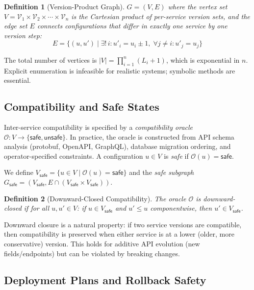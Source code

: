 \documentclass[10pt,twocolumn]{article}
\newtheorem{definition}{Definition}
\begin{document}
\begin{definition}[Version-Product Graph]
$G = (V, E)$ where the vertex set $V = \mathcal{V}_1 \times
\mathcal{V}_2 \times \cdots \times \mathcal{V}_n$ is the
Cartesian product of per-service version sets, and the edge
set $E$ connects configurations that differ in exactly one
service by one version step:
\[
  E = \{(u, u') \mid \exists!\, i : u'_i = u_i \pm 1,\;
        \forall j \neq i : u'_j = u_j\}
\]
\end{definition}

The total number of vertices is $|V| = \prod_{i=1}^{n} (L_i + 1)$,
which is exponential in $n$. Explicit enumeration is infeasible
for realistic systems; symbolic methods are essential.

\subsection{Compatibility and Safe States}

Inter-service compatibility is specified by a \emph{compatibility
oracle} $\mathcal{O} : V \to \{\mathsf{safe}, \mathsf{unsafe}\}$.
In practice, the oracle is constructed from API schema analysis
(protobuf, OpenAPI, GraphQL), database migration ordering, and
operator-specified constraints. A configuration $u \in V$ is
\emph{safe} if $\mathcal{O}(u) = \mathsf{safe}$.

We define $V_{\mathsf{safe}} = \{u \in V \mid \mathcal{O}(u) =
\mathsf{safe}\}$ and the \emph{safe subgraph} $G_{\mathsf{safe}}
= (V_{\mathsf{safe}}, E \cap (V_{\mathsf{safe}} \times V_{\mathsf{safe}}))$.

\begin{definition}[Downward-Closed Compatibility]
\label{def:downward}
The oracle $\mathcal{O}$ is \emph{downward-closed} if for all
$u, u' \in V$: if $u \in V_{\mathsf{safe}}$ and $u' \leq u$
componentwise, then $u' \in V_{\mathsf{safe}}$.
\end{definition}

Downward closure is a natural property: if two service versions
are compatible, then compatibility is preserved when either
service is at a lower (older, more conservative) version.
This holds for additive API evolution (new fields/endpoints)
but can be violated by breaking changes.

\subsection{Deployment Plans and Rollback Safety}
\end{document}
